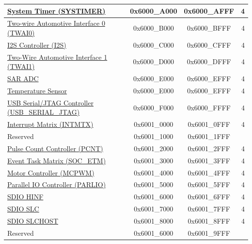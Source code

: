 \begin{ThreePartTable}
\begin{longtable}[c]{ |p{7cm}|c|c|r| }
    \hyperref[mod:systimer]{System Timer (SYSTIMER)}                    & 0x6000\_A000 & 0x6000\_AFFF &   4        \\\hline
    \hyperref[mod:twai]{Two-wire Automotive Interface 0 (TWAI0)}                      & 0x6000\_B000 & 0x6000\_BFFF &   4        \\\hline
    \hyperref[mod:i2s]{I2S Controller (I2S)}            & 0x6000\_C000 & 0x6000\_CFFF &   4     \\\hline
    \hyperref[mod:twai]{Two-Wire Automotive Interface 1 (TWAI1)}                      & 0x6000\_D000 & 0x6000\_DFFF &   4        \\\hline
    \hyperref[mod:adc]{SAR ADC}              & 0x6000\_E000 & 0x6000\_EFFF &   4        \\\hline
    \hyperref[mod:tmpsen]{Temperature Sensor}              & 0x6000\_E000 & 0x6000\_EFFF &   4        \\\hline
    \hyperref[mod:usbserialjtag]{USB Serial/JTAG Controller (USB\_SERIAL\_JTAG)}                  & 0x6000\_F000 & 0x6000\_FFFF &   4     \\\hline
    \hyperref[mod:intmtrx]{Interrupt Matrix (INTMTX)}            & 0x6001\_0000 & 0x6001\_0FFF &   4     \\\hline
        \rowcolor{gray!25}  Reserved                    & 0x6001\_1000 & 0x6001\_1FFF &        \\\hline
    \hyperref[mod:pcnt]{Pulse Count Controller (PCNT)}& 0x6001\_2000 & 0x6001\_2FFF &   4        \\\hline
    \hyperref[mod:evntaskmatrix]{Event Task Matrix (SOC\_ETM)} & 0x6001\_3000 & 0x6001\_3FFF &   4     \\\hline
    \hyperref[mod:mcpwm]{Motor Controller (MCPWM)} & 0x6001\_4000 & 0x6001\_4FFF &   4     \\\hline
    \hyperref[mod:parlio]{Parallel IO Controller (PARLIO) }                    & 0x6001\_5000 & 0x6001\_5FFF &   4        \\\hline
    \hyperref[mod:sdioslave]{SDIO HINF}\tnote{\textcolor{red}{2}}& 0x6001\_6000 & 0x6001\_6FFF &   4     \\\hline
    \hyperref[mod:sdioslave]{SDIO SLC}\tnote{\textcolor{red}{2}} & 0x6001\_7000 & 0x6001\_7FFF &   4  \\\hline
    \hyperref[mod:sdioslave]{SDIO SLCHOST} \tnote{\textcolor{red}{2}}                   & 0x6001\_8000 & 0x6001\_8FFF &   4 \\\hline
        \rowcolor{gray!25}  Reserved                    & 0x6001\_6000 & 0x6001\_9FFF &        \\\hline

\end{longtable}
\end{ThreePartTable}
